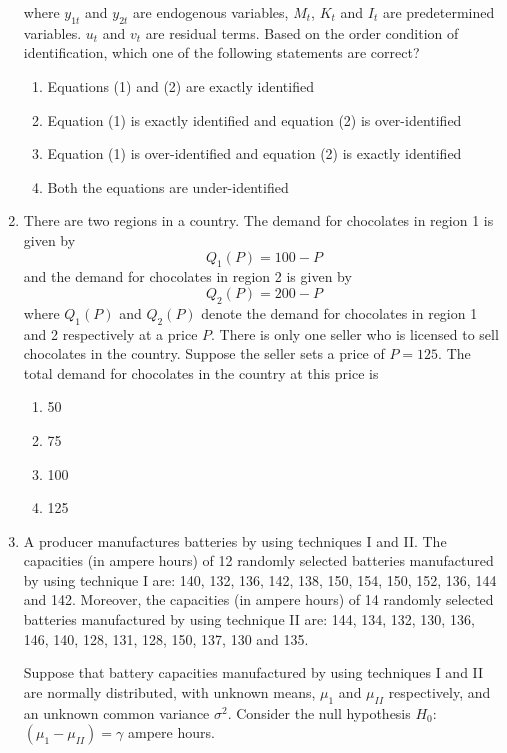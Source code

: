 \documentclass[journal,12pt,onecolumn]{exam}
\theoremstyle{remark}
\begin{document}
\begin{enumerate}
  where $y_{1t}$ and $y_{2t}$ are endogenous variables, $M_t$, $K_t$ and $I_t$ are predetermined variables. $u_t$ and $v_t$ are residual terms. Based on the order condition of identification, which one of the following statements are correct?

  \begin{enumerate}
    \item Equations (1) and (2) are exactly identified
    \item Equation (1) is exactly identified and equation (2) is over-identified
    \item Equation (1) is over-identified and equation (2) is exactly identified
    \item Both the equations are under-identified
  \end{enumerate}

\vspace{1em}

  \item There are two regions in a country. The demand for chocolates in region 1 is given by
  \[
  Q_1(P) = 100 - P
  \]
  and the demand for chocolates in region 2 is given by
  \[
  Q_2(P) = 200 - P
  \]
  where $Q_1(P)$ and $Q_2(P)$ denote the demand for chocolates in region 1 and 2 respectively at a price $P$. There is only one seller who is licensed to sell chocolates in the country. Suppose the seller sets a price of $P = 125$. The total demand for chocolates in the country at this price is

  \begin{enumerate}
    \item 50
    \item 75
    \item 100
    \item 125
  \end{enumerate}

 \newpage

 \item A producer manufactures batteries by using techniques I and II. The capacities (in ampere hours) of 12 randomly selected batteries manufactured by using technique I are: 140, 132, 136, 142, 138, 150, 154, 150, 152, 136, 144 and 142. Moreover, the capacities (in ampere hours) of 14 randomly selected batteries manufactured by using technique II are: 144, 134, 132, 130, 136, 146, 140, 128, 131, 128, 150, 137, 130 and 135.

  Suppose that battery capacities manufactured by using techniques I and II are normally distributed, with unknown means, $\mu_1$ and $\mu_{II}$ respectively, and an unknown common variance $\sigma^2$. Consider the null hypothesis $H_0$: $(\mu_1 - \mu_{II}) = \gamma$ ampere hours.


\end{enumerate}
\end{document}
